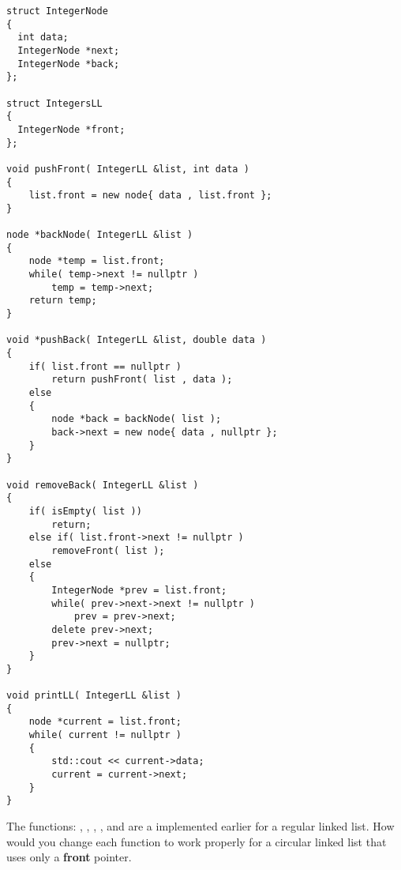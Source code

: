 \documentclass[usenames,dvipsnames]{article}
\begin{document}
\begin{verbatim}
struct IntegerNode
{
  int data;
  IntegerNode *next;
  IntegerNode *back;
};

struct IntegersLL
{
  IntegerNode *front;
};

void pushFront( IntegerLL &list, int data )
{
    list.front = new node{ data , list.front };
}

node *backNode( IntegerLL &list )
{
    node *temp = list.front;
    while( temp->next != nullptr )
        temp = temp->next;
    return temp;
}

void *pushBack( IntegerLL &list, double data )
{
    if( list.front == nullptr )
        return pushFront( list , data );
    else
    {
        node *back = backNode( list );
        back->next = new node{ data , nullptr };
    }
}

void removeBack( IntegerLL &list )
{ 
    if( isEmpty( list ))
        return;
    else if( list.front->next != nullptr )
        removeFront( list );
    else
    {
        IntegerNode *prev = list.front;
        while( prev->next->next != nullptr )
            prev = prev->next;
        delete prev->next;
        prev->next = nullptr;
    }
}

void printLL( IntegerLL &list )
{
    node *current = list.front;
    while( current != nullptr )
    {
        std::cout << current->data;
        current = current->next;
    }
}
\end{verbatim}


\begin{question}
The functions: , , , , and  are a implemented earlier for a regular linked list.
How would you change each function to work properly for a circular linked list that uses only a \textbf{front} pointer.
\end{question}

\begin{solution}

\end{solution}
\end{document}
